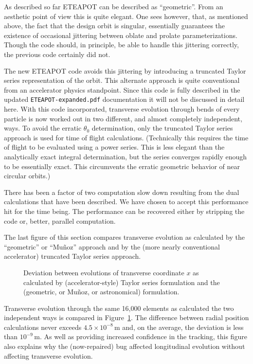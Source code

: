 \documentclass[]{article}
\begin{document}
As described so far ETEAPOT can be described as ``geometric''. From
an aesthetic point of view this is quite elegant. One sees however, that,
as mentioned above, the fact that the design orbit is singular, essentially
guarantees the existence of occasional jittering between oblate and
prolate parameterizations. Though the code should, in principle, be able
to handle this jittering correctly, the previous code certainly did not. 

The new ETEAPOT code avoids this jittering by introducing a truncated
Taylor series representation of the orbit. This alternate approach is
quite conventional from an accelerator physics standpoint.
Since this code is fully described 
in the updated {\tt ETEAPOT-expanded.pdf} documentation it will not be 
discussed in detail here. With this code incorporated, transverse 
evolution through bends of every particle is now worked out in two different, 
and almost completely independent, ways.
To avoid the erratic $\theta_0$
determination, only the truncated Taylor series approach is used for time 
of flight calculations. (Technically this requires the time of flight to
be evaluated using a power series. This is less elegant 
than the analytically exact integral determination, but the series
converges rapidly enough to be essentially exact. This circumvents the 
erratic geometric behavior of near circular orbits.) 

There has been a factor of two computation slow down
resulting from the dual calculations that have been described. We have 
chosen to accept this performance hit
for the time being. The performance can be recovered either by stripping the
code or, better, parallel computation.

The last figure of this section compares transverse evolution
as calculated by the ``geometric'' or ``Mu\~noz'' approach and
by the (more nearly conventional accelerator) truncated Taylor series
approach. 
%
\begin{figure}[h]
\centering
\caption{\label{fig:MunozRT-compare}Deviation between evolutions of
transverse coordinate $x$ as calculated by (accelerator-style) 
Taylor series formulation and the (geometric, or Mu\~noz, or 
astronomical) formulation.}
\end{figure}
%
Transverse evolution through the same 16,000 elements as
calculated the two independent ways is compared in 
Figure~\ref{fig:MunozRT-compare}. The difference between
radial position calculations never exceeds 
$4.5\times10^{-8}\,$m and, on the average, the deviation
is less than $10^{-9}\,$m. As well as providing
increased confidence in the tracking, this figure also explains
why the (now-repaired) bug affected longitudinal evolution
without affecting transverse evolution.
\end{document}
